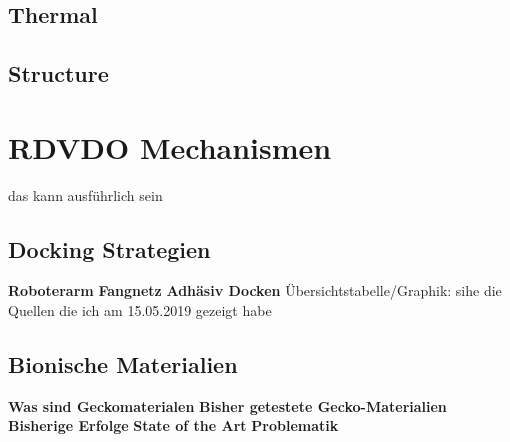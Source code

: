 		\subsection{Thermal}
		\subsection{Structure}
				
	\section{RDVDO Mechanismen} das kann ausführlich sein
		\subsection{Docking Strategien}
						\textbf{Roboterarm}
						\textbf{Fangnetz}
						\textbf{Adhäsiv Docken}
						Übersichtstabelle/Graphik: sihe die Quellen die ich am 15.05.2019 gezeigt habe
		\subsection{Bionische Materialien}
						\textbf{Was sind Geckomaterialen}
						\textbf{Bisher getestete Gecko-Materialien}
						\textbf{Bisherige Erfolge}
						\textbf{State of the Art}
						\textbf{Problematik}